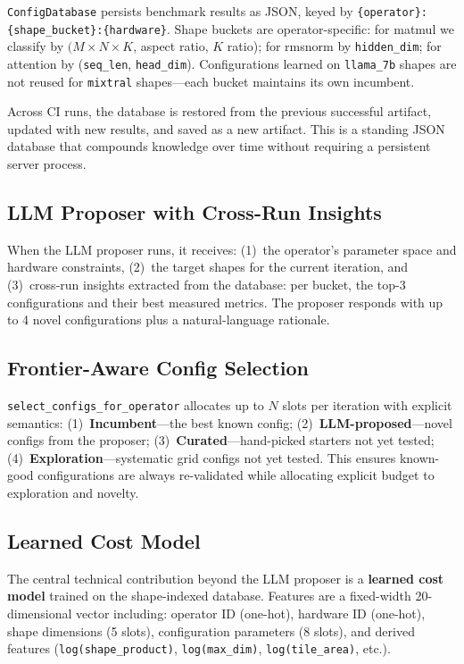 \documentclass[11pt]{article}
\begin{document}
\texttt{ConfigDatabase} persists benchmark results as JSON, keyed by
\texttt{\{operator\}:\{shape\_bucket\}:\{hardware\}}. Shape buckets are
operator-specific: for matmul we classify by $(M \times N \times K$, aspect
ratio, $K$ ratio); for rmsnorm by \texttt{hidden\_dim}; for attention by
(\texttt{seq\_len}, \texttt{head\_dim}). Configurations learned on
\texttt{llama\_7b} shapes are not reused for \texttt{mixtral} shapes---each
bucket maintains its own incumbent.

Across CI runs, the database is restored from the previous successful artifact,
updated with new results, and saved as a new artifact. This is a standing JSON
database that compounds knowledge over time without requiring a persistent
server process.


\subsection{LLM Proposer with Cross-Run Insights}
\label{sec:llm-proposer}

When the LLM proposer runs, it receives: (1)~the operator's parameter space and
hardware constraints, (2)~the target shapes for the current iteration, and
(3)~cross-run insights extracted from the database: per bucket, the top-3
configurations and their best measured metrics. The proposer responds with up to
4 novel configurations plus a natural-language rationale.


\subsection{Frontier-Aware Config Selection}
\label{sec:frontier}

\texttt{select\_configs\_for\_operator} allocates up to $N$ slots per iteration
with explicit semantics: (1)~\textbf{Incumbent}---the best known config;
(2)~\textbf{LLM-proposed}---novel configs from the proposer;
(3)~\textbf{Curated}---hand-picked starters not yet tested;
(4)~\textbf{Exploration}---systematic grid configs not yet tested. This ensures
known-good configurations are always re-validated while allocating explicit
budget to exploration and novelty.


\subsection{Learned Cost Model}
\label{sec:cost-model}

The central technical contribution beyond the LLM proposer is a
\textbf{learned cost model} trained on the shape-indexed database. Features are a
fixed-width 20-dimensional vector including: operator ID (one-hot), hardware ID
(one-hot), shape dimensions (5 slots), configuration parameters (8 slots), and
derived features (\texttt{log(shape\_product)}, \texttt{log(max\_dim)},
\texttt{log(tile\_area)}, etc.).
\end{document}
